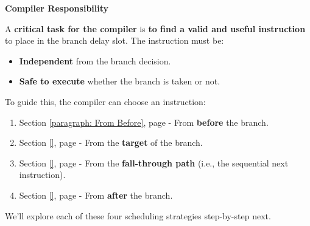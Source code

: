 \highspace
\begin{flushleft}
    \textcolor{Red2}{ \textbf{Compiler Responsibility}}
\end{flushleft}
A \textbf{critical task for the compiler} is \textbf{to find a valid and useful instruction} to place in the branch delay slot. The instruction must be:
\begin{itemize}
    \item \textbf{Independent} from the branch decision.
    \item \textbf{Safe to execute} whether the branch is taken or not.
\end{itemize}
To guide this, the compiler can choose an instruction:
\begin{enumerate}
    \item Section \ref{paragraph: From Before}, page \pageref{paragraph: From Before} - From \textbf{before} the branch.
    \item Section \ref{}, page \pageref{} - From the \textbf{target} of the branch.
    \item Section \ref{}, page \pageref{} - From the \textbf{fall-through path} (i.e., the sequential next instruction).
    \item Section \ref{}, page \pageref{} - From \textbf{after} the branch.
\end{enumerate}
We'll explore each of these four scheduling strategies step-by-step next.